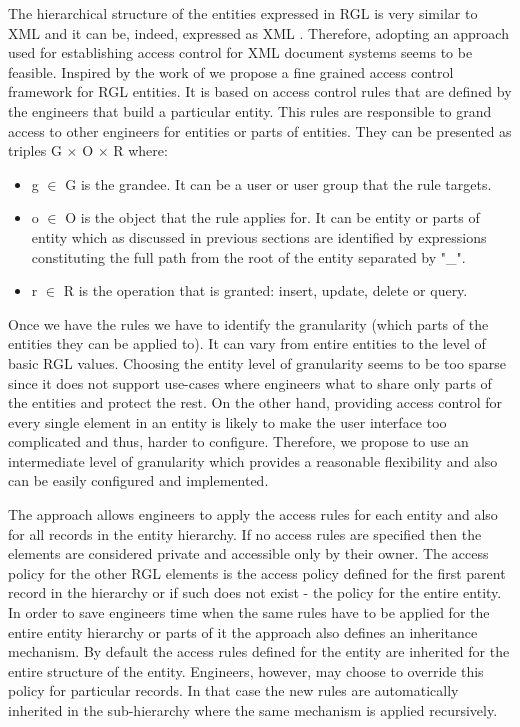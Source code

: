 The hierarchical structure of the entities expressed in RGL is very similar to XML and it can be, indeed, expressed as XML \cite{feliksik2011}. Therefore, adopting an approach used for establishing access control for XML document systems seems to be feasible. Inspired by the work of \cite{wu2005access} we propose a fine grained access control framework for RGL entities. It is based on access control rules that are defined by the engineers that build a particular entity. This rules are responsible to grand access to other engineers for entities or parts of entities. They can be presented as triples G $\times$ O $\times$ R where: 
\begin{itemize}
	\item g $\in$ G is the grandee. It can be a user or user group that the rule targets.
	\item o $\in$ O is the object that the rule applies for. It can be entity or parts of entity which as discussed in previous sections are identified by expressions constituting the full path from the root of the entity separated by "\_".  
	\item r $\in$ R is the operation that is granted: insert, update, delete or query.
\end{itemize}

Once we have the rules we have to identify the granularity (which parts of the entities they can be applied to). It can vary from entire entities to the level of basic RGL values. Choosing the entity level of granularity seems to be too sparse since it does not support use-cases where engineers what to share only parts of the entities and protect the rest. On the other hand, providing access control for every single element in an entity is likely to make the user interface too complicated and thus, harder to configure. Therefore, we propose to use an intermediate level of granularity which provides a reasonable flexibility and also can be easily configured and implemented. 

The approach allows engineers to apply the access rules for each entity and  also for all records in the entity hierarchy. If no access rules are specified then the elements are considered private and accessible only by their owner. The access policy for the other RGL elements is the access policy defined for the first parent record in the hierarchy or if such does not exist - the policy for the entire entity. In order to save engineers time when the same rules have to be applied for the entire entity hierarchy or parts of it the approach also defines an inheritance mechanism. By default the access rules defined for the entity are inherited for the entire structure of the entity. Engineers, however, may choose to override this policy for particular records. In that case the new rules are automatically inherited in the sub-hierarchy where the same mechanism is applied recursively.



